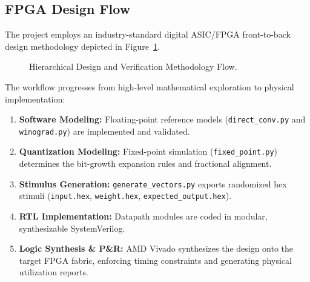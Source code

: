 \documentclass[12pt,a4paper]{article}
\begin{document}
\subsection{FPGA Design Flow}
The project employs an industry-standard digital ASIC/FPGA front-to-back design methodology depicted in Figure~\ref{fig:design_flow}.
\begin{figure}[htbp]
    \centering
    \caption{Hierarchical Design and Verification Methodology Flow.}
    \label{fig:design_flow}
\end{figure}

The workflow progresses from high-level mathematical exploration to physical implementation:
\begin{enumerate}
    \item \textbf{Software Modeling:} Floating-point reference models (\texttt{direct\_conv.py} and \texttt{winograd.py}) are implemented and validated.
    \item \textbf{Quantization Modeling:} Fixed-point simulation (\texttt{fixed\_point.py}) determines the bit-growth expansion rules and fractional alignment.
    \item \textbf{Stimulus Generation:} \texttt{generate\_vectors.py} exports randomized hex stimuli (\texttt{input.hex}, \texttt{weight.hex}, \texttt{expected\_output.hex}).
    \item \textbf{RTL Implementation:} Datapath modules are coded in modular, synthesizable SystemVerilog.
    \item \textbf{Logic Synthesis \& P\&R:} AMD Vivado synthesizes the design onto the target FPGA fabric, enforcing timing constraints and generating physical utilization reports.
\end{enumerate}
\end{document}
